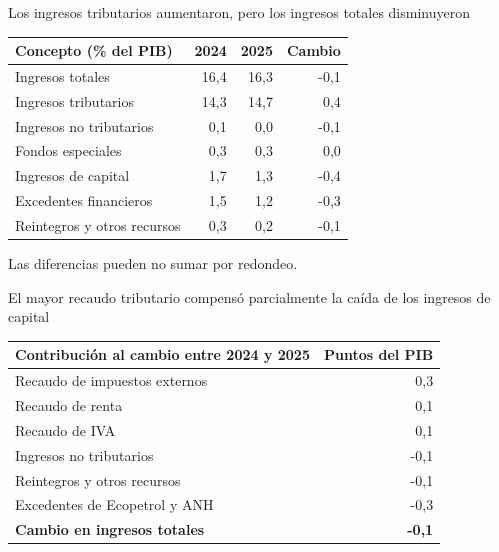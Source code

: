 \begin{frame}{Los ingresos tributarios aumentaron, pero los ingresos totales disminuyeron}
\centering
\small
\begin{tabular}{lrrr}
\toprule
\textbf{Concepto (\% del PIB)} & \textbf{2024} & \textbf{2025} & \textbf{Cambio} \\
\midrule
Ingresos totales        & 16,4 & 16,3 & -0,1 \\
Ingresos tributarios    & 14,3 & 14,7 &  0,4 \\
Ingresos no tributarios &  0,1 &  0,0 & -0,1 \\
Fondos especiales       &  0,3 &  0,3 &  0,0 \\
Ingresos de capital     &  1,7 &  1,3 & -0,4 \\
\quad Excedentes financieros & 1,5 & 1,2 & -0,3 \\
\quad Reintegros y otros recursos & 0,3 & 0,2 & -0,1 \\
\bottomrule
\end{tabular}
\vspace{0.25cm}
\scriptsize Las diferencias pueden no sumar por redondeo.
\end{frame}

\begin{frame}{El mayor recaudo tributario compensó parcialmente la caída de los ingresos de capital}
\centering
\small
\begin{tabular}{lr}
\toprule
\textbf{Contribución al cambio entre 2024 y 2025} & \textbf{Puntos del PIB} \\
\midrule
Recaudo de impuestos externos &  0,3 \\
Recaudo de renta              &  0,1 \\
Recaudo de IVA                &  0,1 \\
Ingresos no tributarios       & -0,1 \\
Reintegros y otros recursos   & -0,1 \\
Excedentes de Ecopetrol y ANH & -0,3 \\
\midrule
\textbf{Cambio en ingresos totales} & \textbf{-0,1} \\
\bottomrule
\end{tabular}
\end{frame}